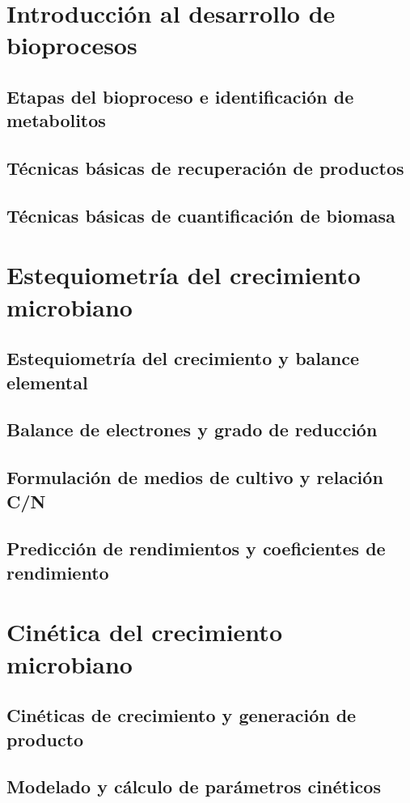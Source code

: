 \documentclass{AsignaturaResumen}
\begin{document}
    \frontmatter

\Portada
\Indices

    \mainmatter


\part{Introducción al desarrollo de bioprocesos}

    \chapter{Etapas del bioproceso e identificación de metabolitos} 
    \chapter{Técnicas básicas de recuperación de productos} 
    \chapter{Técnicas básicas de cuantificación de biomasa} 

\part{Estequiometría del crecimiento microbiano}

    \chapter{Estequiometría del crecimiento y balance elemental} 
    \chapter{Balance de electrones y grado de reducción} 
    \chapter{Formulación de medios de cultivo y relación C/N} 
    \chapter{Predicción de rendimientos y coeficientes de rendimiento}     

\part{Cinética del crecimiento microbiano}

    \chapter{Cinéticas de crecimiento y generación de producto} 
    \chapter{Modelado y cálculo de parámetros cinéticos} 


    \PlainGeom
    \appendix



    \backmatter

\Bibliografia
\Glosarios
\end{document}
